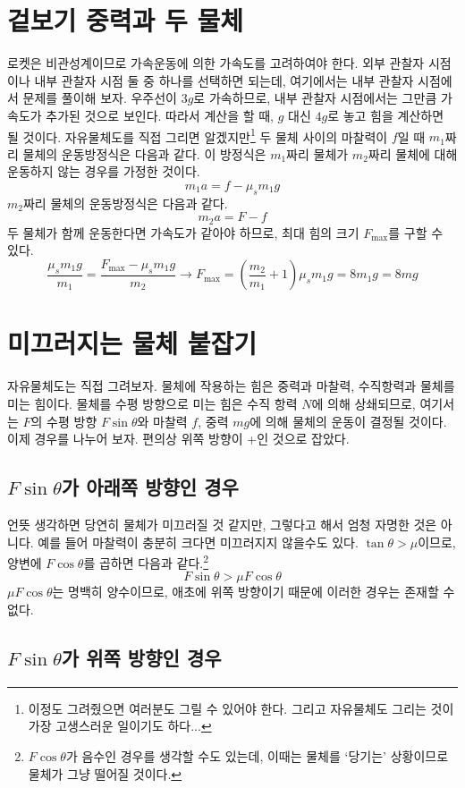 \documentclass{scrartcl}
\begin{document}
\section{겉보기 중력과 두 물체}
로켓은 비관성계이므로 가속운동에 의한 가속도를 고려하여야 한다. 외부 관찰자 시점이나 내부 관찰자 시점 둘 중 하나를 선택하면 되는데, 여기에서는 내부 관찰자 시점에서 문제를 풀이해 보자. 우주선이 \(3g\)로 가속하므로, 내부 관찰자 시점에서는 그만큼 가속도가 추가된 것으로 보인다. 따라서 계산을 할 때, \(g\) 대신 \(4g\)로 놓고 힘을 계산하면 될 것이다. 자유물체도를 직접 그리면 알겠지만\footnote{이정도 그려줬으면 여러분도 그릴 수 있어야 한다. 그리고 자유물체도 그리는 것이 가장 고생스러운 일이기도 하다...} 두 물체 사이의 마찰력이 \(f\)일 때 \(m_1\)짜리 물체의 운동방정식은 다음과 같다. 이 방정식은 \(m_1\)짜리 물체가 \(m_2\)짜리 물체에 대해 운동하지 않는 경우를 가정한 것이다.
\[m_1 a=f-\mu_s m_1 g\]
\(m_2\)짜리 물체의 운동방정식은 다음과 같다.
\[m_2 a=F-f\]
두 물체가 함께 운동한다면 가속도가 같아야 하므로, 최대 힘의 크기 \(F_\text{max}\)를 구할 수 있다.
\[\frac{\mu_s m_1 g}{m_1}=\frac{F_\text{max}-\mu_s m_1 g}{m_2}\longrightarrow F_\text{max}=\left( \frac{m_2}{m_1}+1 \right)\mu_s m_1 g=8m_1 g=8mg\]

\section{미끄러지는 물체 붙잡기}
자유물체도는 직접 그려보자. 물체에 작용하는 힘은 중력과 마찰력, 수직항력과 물체를 미는 힘이다. 물체를 수평 방향으로 미는 힘은 수직 항력 \(N\)에 의해 상쇄되므로, 여기서는 \(F\)의 수평 방향 \(F\sin\theta\)와 마찰력 \(f\), 중력 \(mg\)에 의해 물체의 운동이 결정될 것이다. 이제 경우를 나누어 보자. 편의상 위쪽 방향이 +인 것으로 잡았다.

\subsection{\(F\sin\theta\)가 아래쪽 방향인 경우}
언뜻 생각하면 당연히 물체가 미끄러질 것 같지만, 그렇다고 해서 엄청 자명한 것은 아니다. 예를 들어 마찰력이 충분히 크다면 미끄러지지 않을수도 있다. \(\tan\theta>\mu\)이므로, 양변에 \(F\cos\theta\)를 곱하면 다음과 같다.\footnote{\(F\cos\theta\)가 음수인 경우를 생각할 수도 있는데, 이때는 물체를 `당기는' 상황이므로 물체가 그냥 떨어질 것이다.}
\[F\sin\theta>\mu F\cos\theta\]
\(\mu F\cos\theta\)는 명백히 양수이므로, 애초에 위쪽 방향이기 때문에 이러한 경우는 존재할 수 없다.

\subsection{\(F\sin\theta\)가 위쪽 방향인 경우}
\end{document}
